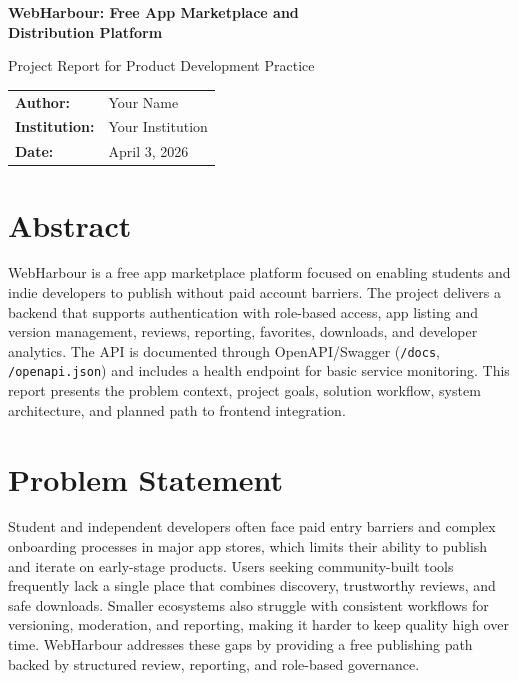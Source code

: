\documentclass[12pt,a4paper]{article}
\begin{document}
\begin{titlepage}
    \centering
    \vspace*{1in}
    {\LARGE\bfseries WebHarbour: Free App Marketplace and \\ Distribution Platform\par}
    \vspace{0.4in}
    {\large Project Report for Product Development Practice\par}
    \vfill
    \begin{tabular}{ll}
        \textbf{Author:} & Your Name \\
        \textbf{Institution:} & Your Institution \\
        \textbf{Date:} & April 3, 2026
    \end{tabular}
    \vfill
\end{titlepage}

\tableofcontents
\newpage

\section{Abstract}
WebHarbour is a free app marketplace platform focused on enabling students and indie developers to publish without paid account barriers. The project delivers a backend that supports authentication with role-based access, app listing and version management, reviews, reporting, favorites, downloads, and developer analytics. The API is documented through OpenAPI/Swagger (\texttt{/docs}, \texttt{/openapi.json}) and includes a health endpoint for basic service monitoring. This report presents the problem context, project goals, solution workflow, system architecture, and planned path to frontend integration.

\section{Problem Statement}
Student and independent developers often face paid entry barriers and complex onboarding processes in major app stores, which limits their ability to publish and iterate on early-stage products. Users seeking community-built tools frequently lack a single place that combines discovery, trustworthy reviews, and safe downloads. Smaller ecosystems also struggle with consistent workflows for versioning, moderation, and reporting, making it harder to keep quality high over time. WebHarbour addresses these gaps by providing a free publishing path backed by structured review, reporting, and role-based governance.
\end{document}

